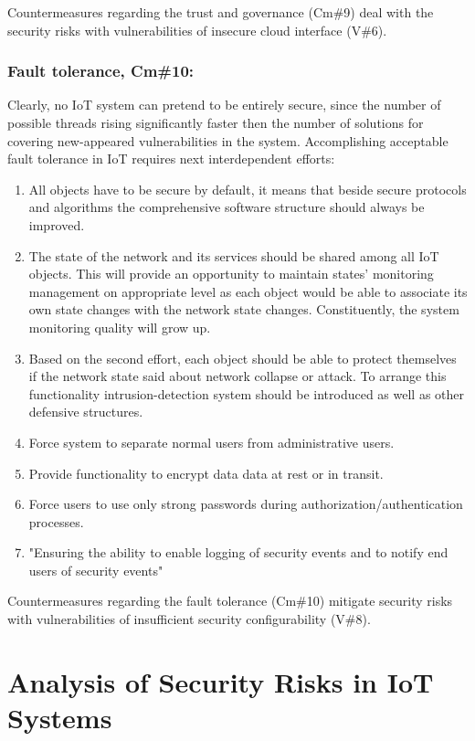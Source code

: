 \documentclass[12pt]{article}
\begin{document}
Countermeasures regarding the trust and governance (Cm\#9) deal with the security risks with vulnerabilities of insecure cloud interface (V\#6).
 
\subsubsection{Fault tolerance, Cm\#10:} 
 Clearly, no IoT system can pretend to be entirely secure, since the number of possible threads rising significantly faster then the number of solutions for covering new-appeared vulnerabilities in the system. Accomplishing acceptable fault tolerance in IoT requires next interdependent efforts:
 		\begin{enumerate}
 			\item All objects have to be secure by default, it means that beside secure protocols and algorithms the comprehensive software structure should always be improved.
 			\item The state of the network and its services should be shared among all IoT objects. This will provide an opportunity to maintain states' monitoring management on appropriate level as each object would be able to associate its own state changes with the network state changes. Constituently, the system monitoring quality will grow up.
 			\item Based on the second effort, each object should be able to protect themselves if the network state said about network collapse or attack. To arrange this functionality intrusion-detection system should be introduced as well as other defensive structures.
 			\item Force system to separate  normal users from administrative users.
			\item Provide functionality to encrypt data data at rest or in transit.
			\item Force users to use only strong passwords during authorization/authentication processes.
			\item "Ensuring the ability to enable logging of security events and to notify end users of security events" 
 		\end{enumerate}
 

Countermeasures regarding the fault tolerance (Cm\#10) mitigate security risks with vulnerabilities of insufficient security configurability (V\#8).

\newpage
\section{Analysis of Security Risks in IoT Systems}
\end{document}
